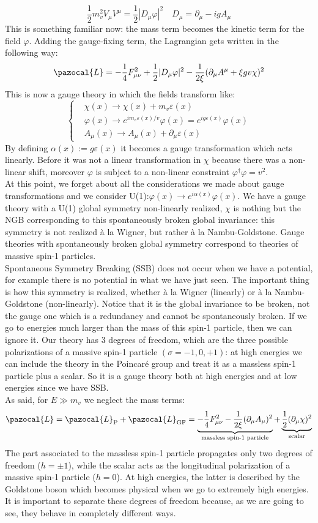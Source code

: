 \documentclass[../main.tex]{subfiles}
\begin{document}
\[
\frac{1}{2}m_v^2V_\mu V^\mu=\frac{1}{2}|D_\mu\varphi|^2 \quad D_\mu=\partial_\mu-igA_\mu
\]
This is something familiar now: the mass term becomes the kinetic term for the field $\varphi$. Adding the gauge-fixing term, the Lagrangian gets written in the following way:
\[
\pazocal{L}=-\frac{1}{4}F_{\mu\nu}^2+\frac{1}{2}|D_\mu\varphi|^2-\frac{1}{2\xi}(\partial_\mu A^\mu+\xi gv\chi)^2
\]
This is now a gauge theory in which the fields transform like:
\[
\left\{
\begin{aligned}
&\chi(x)\to\chi(x)+m_v\varepsilon(x)\\
&\varphi(x)\to e^{im_v\varepsilon(x)/v}\varphi(x)=e^{ig\varepsilon(x)}\varphi(x)\\
&A_\mu(x)\to A_\mu(x)+\partial_\mu\varepsilon(x)
\end{aligned}
\right.
\]
By defining $\alpha(x):=g\varepsilon(x)$ it becomes a gauge transformation which acts linearly. Before it was not a linear transformation in $\chi$ because there was a non-linear shift, moreover $\varphi$ is subject to a non-linear constraint $\varphi^\dagger\varphi=v^2$.\\
At this point, we forget about all the considerations we made about gauge transformations and we consider U(1):$\varphi(x)\to e^{i\alpha(x)}\varphi(x)$. We have a gauge theory with a U(1) global symmetry non-linearly realized, $\chi$ is nothing but the NGB corresponding to this spontaneously broken global invariance: this symmetry is not realized à la Wigner, but rather à la Nambu-Goldstone. Gauge theories with spontaneously broken global symmetry correspond to theories of massive spin-1 particles.\\
Spontaneous Symmetry Breaking (SSB) does not occur when we have a potential, for example there is no potential in what we have just seen. The important thing is how this symmetry is realized, whether à la Wigner (linearly) or à la Nambu-Goldstone (non-linearly). Notice that it is the global invariance to be broken, not the gauge one which is a redundancy and cannot be spontaneously broken. If we go to energies much larger than the mass of this spin-1 particle, then we can ignore it. Our theory has 3 degrees of freedom, which are the three possible polarizations of a massive spin-1 particle $(\sigma=-1,0,+1)$: at high energies we can include the theory in the Poincaré group and treat it as a massless spin-1 particle plus a scalar. So it is a gauge theory both at high energies and at low energies since we have SSB.\\
As said, for $E\gg m_v$ we neglect the mass terms:
\[
\pazocal{L}=\pazocal{L}_{\text{P}}+\pazocal{L}_{\text{GF}}=\underbrace{-\frac{1}{4}F_{\mu\nu}^2-\frac{1}{2\xi}(\partial_\mu A_\mu)^2}_{\text{massless spin-1 particle}}+\underbrace{\frac{1}{2}(\partial_\mu \chi)^2}_{\text{scalar}}
\]
The part associated to the massless spin-1 particle propagates only two degrees of freedom ($h=\pm1$), while the scalar acts as the longitudinal polarization of a massive spin-1 particle ($h=0$). At high energies, the latter is described by the Goldstone boson which becomes physical when we go to extremely high energies. It is important to separate these degrees of freedom because, as we are going to see, they behave in completely different ways.
\end{document}
